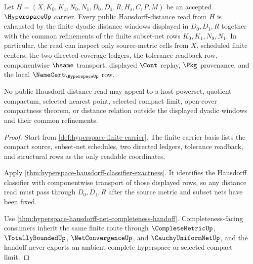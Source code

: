 \begin{theorem}
\label{thm:hyperspace-hausdorff-distance-window}
Let $H=(X,K_0,K_1,N_0,N_1,D_0,D_1,R,H_s,C,P,M)$ be an accepted $\HyperspaceUp$ carrier. Every public Hausdorff-distance read from $H$ is exhausted by the finite dyadic distance windows displayed in $D_0,D_1,R$ together with the common refinements of the finite subset-net rows $K_0,K_1,N_0,N_1$. In particular, the read can inspect only source-metric cells from $X$, scheduled finite centers, the two directed coverage ledgers, the tolerance readback row, componentwise $\hsame$ transport, displayed $\Cont$ replay, $\Pkg$ provenance, and the local $\NameCert_{\HyperspaceUp}$ row.

No public Hausdorff-distance read may appeal to a host powerset, quotient compactum, selected nearest point, selected compact limit, open-cover compactness theorem, or distance relation outside the displayed dyadic windows and their common refinements.
\end{theorem}
\begin{proof}
Start from \autoref{def:hyperspace-finite-carrier}. The finite carrier basis lists the compact source, subset-net schedules, two directed ledgers, tolerance readback, and structural rows as the only readable coordinates.

Apply \autoref{thm:hyperspace-hausdorff-classifier-exactness}. It identifies the Hausdorff classifier with componentwise transport of those displayed rows, so any distance read must pass through $D_0,D_1,R$ after the source metric and subset nets have been fixed.

Use \autoref{thm:hyperspace-hausdorff-net-completeness-handoff}. Completeness-facing consumers inherit the same finite route through $\CompleteMetricUp$, $\TotallyBoundedUp$, $\NetConvergenceUp$, and $\CauchyUniformNetUp$, and the handoff never exports an ambient complete hyperspace or selected compact limit.
\end{proof}

